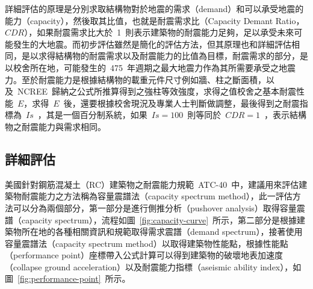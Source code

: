 詳細評估的原理是分別求取結構物對於地震的需求（demand）和可以承受地震的能力（capacity），然後取其比值，也就是耐震需求比（Capacity Demant Ratio，$CDR$），如果耐震需求比大於~1~則表示建築物的耐震能力足夠，足以承受未來可能發生的大地震。而初步評估雖然是簡化的評估方法，但其原理也和詳細評估相同，是以求得結構物的耐震需求以及耐震能力的比值為目標，耐震需求的部分，是以校舍所在地，可能發生的~475~年週期之最大地震力作為其所需要承受之地震力。至於耐震能力是根據結構物的載重元件尺寸例如牆、柱之斷面積，以及~NCREE~歸納之公式所推算得到之強柱等效強度，求得之值校舍之基本耐震性能~$E$，求得~$E$~後，還要根據校舍現況及專業人士判斷做調整，最後得到之耐震指標為~$Is$~，其是一個百分制系統，如果~$Is = 100$~則等同於~$CDR = 1$~，表示結構物之耐震能力與需求相同。




\subsection{詳細評估}

美國針對鋼筋混凝土（RC）建築物之耐震能力規範~ATC-40\cite{applied1996seismic}~中，建議用來評估建築物耐震能力之方法稱為容量震譜法（capacity spectrum method），此一評估方法可以分為兩個部分，第一部分是進行側推分析（pushover analysis）取得容量震譜（capacity spectrum），流程如圖~\ref{fig:capacity-curve}~所示，第二部分是根據建築物所在地的各種相關資訊和規範取得需求震譜（demand spectrum），接著使用容量震譜法（capacity spectrum method）以取得建築物性能點，根據性能點（performance point）座標帶入公式計算可以得到建築物的破壞地表加速度（collapse ground acceleration）以及耐震能力指標（aseismic ability index），如圖~\ref{fig:performance-point}~所示。

